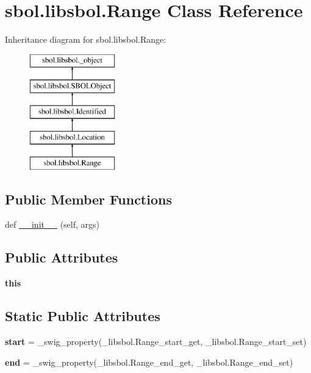\hypertarget{classsbol_1_1libsbol_1_1_range}{}\section{sbol.\+libsbol.\+Range Class Reference}
\label{classsbol_1_1libsbol_1_1_range}
Inheritance diagram for sbol.\+libsbol.\+Range\+:\begin{figure}[H]
\begin{center}
\leavevmode
\includegraphics[height=5.000000cm]{classsbol_1_1libsbol_1_1_range}
\end{center}
\end{figure}
\subsection*{Public Member Functions}
\begin{DoxyCompactItemize}
\item 
def \hyperlink{classsbol_1_1libsbol_1_1_range_acaca7d66f76cb30862b0ce2da7f03380}{\+\_\+\+\_\+init\+\_\+\+\_\+} (self, args)
\end{DoxyCompactItemize}
\subsection*{Public Attributes}
\begin{DoxyCompactItemize}
\item 
{\bfseries this}\hypertarget{classsbol_1_1libsbol_1_1_range_a723f677d1a9d6b83eadbfd5a8c5e4919}{}\label{classsbol_1_1libsbol_1_1_range_a723f677d1a9d6b83eadbfd5a8c5e4919}

\end{DoxyCompactItemize}
\subsection*{Static Public Attributes}
\begin{DoxyCompactItemize}
\item 
{\bfseries start} = \+\_\+swig\+\_\+property(\+\_\+libsbol.\+Range\+\_\+start\+\_\+get, \+\_\+libsbol.\+Range\+\_\+start\+\_\+set)\hypertarget{classsbol_1_1libsbol_1_1_range_aa5e49184d4560a11d40bfc7f9f3653f1}{}\label{classsbol_1_1libsbol_1_1_range_aa5e49184d4560a11d40bfc7f9f3653f1}

\item 
{\bfseries end} = \+\_\+swig\+\_\+property(\+\_\+libsbol.\+Range\+\_\+end\+\_\+get, \+\_\+libsbol.\+Range\+\_\+end\+\_\+set)\hypertarget{classsbol_1_1libsbol_1_1_range_a6d72116552669a0aaf8729a32ee5dd9c}{}\label{classsbol_1_1libsbol_1_1_range_a6d72116552669a0aaf8729a32ee5dd9c}

\end{DoxyCompactItemize}



